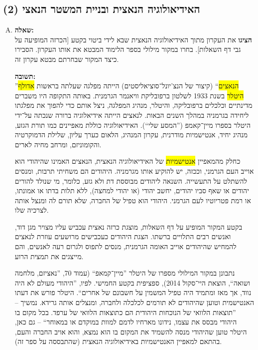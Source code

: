 \documentclass[a4paper]{article}
\newcommand\hl[1]   {\colorbox{yellow}{\!\!#1\!\!}}
\begin{document}
	\subsection{האידיאולוגיה הנאצית ובניית המשטר הנאצי (2)}
		\begin{enumerate}[A.]
			\item \textbf{שאלה: }\\
			\textbf{הציגו} את העקרון מתוך האידיאולוגיה הנאצית שבא לידי ביטוי בקטע [הכרזה המופיעה על גבי דף השאלות]. בחרו במקור מילולי בספר הלימוד המבטא את אותו העקרון. הסבירו כיצד המקור שבחרתם מבטא עקרון זה. 
			
			\textbf{תשובה: }\\
			''\hl{הנאצים}`` (קיצור של הנצ'יונל־סוציאליסטים) הייתה מפלגה שעלתה בראשות \hl{אדולף היטלר} בשנת 1933 לשלטון ברפובליקת וויאנמר הגרמנית. באותה התקופה היו משברים מדינתיים וכלכלים ברפובליקה, והיטלר, מנהיג המפלגה, ניצל אותם כדי להפוך את מפלגתו ליחידה בגרמניה במהלך השנים הבאות. לנאצים הייתה אידיאלוגיה ברורה שנכתה על־ידי היטלר בספרו מיין־קאמפ (''המסע שלי``). האידיאולוגיה כוללת מאפיינים כמו תורת הגזע, מנהיג יחיד, אנטישמיות מודרנית, עקרון המנהיג, הלאום כערך עליון, שלילת הדמוקרטיה והקומוניזם, ומרחב מחיה לארים. 
			
			כחלק מהמאפיין \hl{אנטישמיות} של האידיאולוגיה הנאצית, הנאצים האמינו שהיהודי הוא אוייב העם הגרמני, וככזה, יש להוקיע אותו מגרמניה. היהודים הם משחיתי תרבות, ומנסים להשתלט על התעשייה. השנאה ליהודים מבוססת דת ולא גזע, כלומר, מי שנולד להורים יהודים או שאף סביו יהודים, יחשב יהודי (או יהודי למחצה), ללא תלות בדתו או אמונתו, או רמת פטריוטיו לעם הגרמני. היהודי הוא טפיל של החברה, שלא תורם לה ומנצל אותה לצרכיה שלו. 
			
			בקטע המקור המופיע על דף השאלות, מוצגת כרזה נאצית עכביש עליו מצויר מגן דוד, ואנשים רבים התלויים ברשתו. הצגת היהודים כעכבישים מרושעים עוזרת לנאצים להמחיש שהיהודים אוייב האומה הגרמנית, מנסים לתפוס ולגרום רעה לאנשים, והם מייצגים את תמצית הרוע. 
			
			נתבונן במקור המילולי מספרו של היטלר ''מיין־קמאפ`` (עמוד 70, ''נאציזם, מלחמה ושואה``, הוצאת היי־סקול 2014), ספציפית בקטע החמישי. לפיו, ''היהודי מעולם לא היה נווד, אך מאז ומתמיד היה טפיל המשמין על חשבונם של אחרים``. היטלר פורש את דעתו האנטישמית וטוען שהיהודים לא תורמים לכלכלה ולחברה, ומנצלים אותה גרידא. נמשיך – ''תוצאות הלוואי של הנוכחות היהודית הם כתוצאות הלוואי של ערפד. בכל מקום בו היהודי מבסס את עצמו, נידונו מארחיו לדמם למוות במוקדם או במאוחר`` – גם כאן, היטלר טוען שהיהודי מנסה להשמיד את המקום בו הוא נמצא, והוא אויב החברה והעם, בהתאם למאפיין האנטישמיות באידיאולוגיה הנאצית (שהתבססה על ספר זה). 
			

\end{enumerate}
\end{document}
